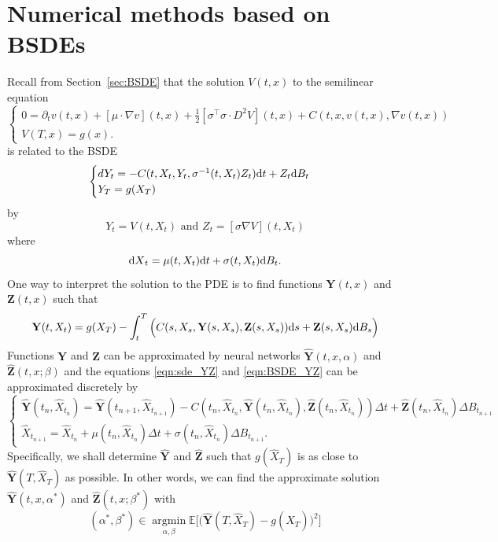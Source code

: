\documentclass[11pt]{book}
\newcommand{\dd}{\text{\normalfont d}}
\newcommand{\dt}{\text{\normalfont d}t}
\newcommand{\ds}{\text{\normalfont d}s}
\newcommand{\dX}{\text{\normalfont d}X}
\begin{document}
\section{Numerical methods based on BSDEs}
Recall from Section~\ref{sec:BSDE} that the solution $V(t,x)$ to the semilinear equation 
\begin{equation}
\begin{cases}
0=\partial_{t}v(t,x)+[\mu\cdot{\nabla}v](t,x)+\frac12[{\sigma^\intercal\sigma\cdot}D^2V](t,x)+C(t,x,v(t,x),\nabla v(t,x))\\
V(T,x)=g(x).
\end{cases}		
\end{equation}
is related to the BSDE
\begin{equation}
\begin{cases}
dY_t=- C(t,X_t,Y_t,\sigma^{-1}(t,X_t)Z_t){{\dt}}+Z_t{\dd}B_t\\
Y_T=g(X_T)
\end{cases}
\end{equation}
by 
\begin{equation}
    Y_t=V(t,X_t) \textrm{ and } Z_t=[\sigma\nabla V](t,X_t)
\end{equation}
where 
\begin{equation}\label{eqn:sde_YZ}
{\dX}_t=\mu(t,X_t){{\dt}}+\sigma(t,X_t){\dd}B_t.
\end{equation}
One way to interpret the solution to the PDE is to find  functions $\mathbf{Y}(t,x)$ and $\mathbf{Z}(t,x)$ such that 
\begin{equation}\label{eqn:BSDE_YZ}
\mathbf{Y}(t,X_t)=g(X_T) -\int_t^T \Big(C(s,X_s,\mathbf{Y}(s,X_s),\mathbf{Z}(s,X_s)){{\ds}}+\mathbf{Z}(s,X_s){\dd}B_s\Big)
\end{equation}
Functions $\mathbf{Y}$ and $\mathbf{Z}$ can be approximated by neural networks $\hat{\mathbf{Y}}(t,x,\alpha)$ and $\hat{\mathbf{Z}}(t,x;\beta)$ and the equations \eqref{eqn:sde_YZ} and \eqref{eqn:BSDE_YZ} can be approximated discretely by 
\begin{equation}
\begin{cases}
\hat{\mathbf{Y}}(t_n,\hat{X}_{t_n})
=\hat{\mathbf{Y}} (t_{n+1},\hat{X}_{t_{n+1}}) 
- C(t_n,\hat{X}_{t_n},\hat{\mathbf{Y}}(t_n,\hat{X}_{t_n}),\hat{\mathbf{Z}}(t_n,\hat{X}_{t_n})) \Delta t
+\hat{\mathbf{Z}}(t_n,\hat{X}_{t_n})\Delta B_{t_{n+1}}\\
\hat{X}_{t_{n+1}}=\hat{X}_{t_n}+\mu(t_n,\hat{X}_{t_n})\Delta t+\sigma(t_n,\hat{X}_{t_n})\Delta B_{t_{n+1}}.
\end{cases}
\end{equation}
Specifically, we shall determine $\hat{\mathbf{Y}}$ and $\hat{\mathbf{Z}}$ such that $g(\hat{X}_T)$ is as close to $\hat{\mathbf{Y}}(T,\hat{X}_T)$ as possible. In other words,  we can find the approximate solution $\hat{\mathbf{Y}}(t,x,\alpha^*)$ and $\hat{\mathbf{Z}}(t,x;\beta^*)$ with 
\begin{equation}
    (\alpha^*,\beta^*)\in\mathop\textrm{argmin}\limits_{\alpha,\beta}\mathbb{E}\Big[\big(\hat{\mathbf{Y}}(T,\hat{X}_T)-g(\hat{X}_T)\big)^2\Big]
\end{equation}
\end{document}

